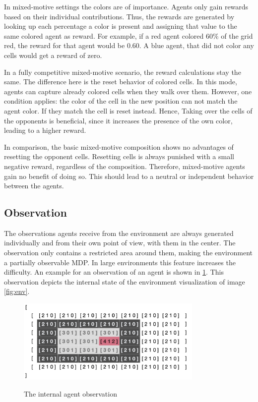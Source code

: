 In mixed-motive settings the colors are of importance. Agents only gain rewards based on their individual contributions. Thus, the rewards are generated by looking up each percentage a color is present and assigning that value to the same colored agent as reward. For example, if a red agent colored 60\% of the grid red, the reward for that agent would be 0.60. A blue agent, that did not color any cells would get a reward of zero.

In a fully competitive mixed-motive scenario, the reward calculations stay the same. The difference here is the reset behavior of colored cells. In this mode, agents can capture already colored cells when they walk over them. However, one condition applies: the color of the cell in the new position can not match the agent color. If they match the cell is reset instead. Hence, Taking over the cells of the opponents is beneficial, since it increases the presence of the own color, leading to a higher reward.

In comparison, the basic mixed-motive composition shows no advantages of resetting the opponent cells. Resetting cells is always punished with a small negative reward, regardless of the composition. Therefore, mixed-motive agents gain no benefit of doing so. This should lead to a neutral or independent behavior between the agents.

\subsection{Observation}
The observations agents receive from the environment are always generated individually and from their own point of view, with them in the center. The observation only contains a restricted area around them, making the environment a partially observable MDP. In large environments this feature increases the difficulty.
An example for an observation of an agent is shown in \ref{fig:agent_obs}. This observation depicts the internal state of the environment visualization of image \ref{fig:env}.

\begin{figure}[hpbt]
    \centering
    \includegraphics[width=0.8\textwidth]{pictures/agent_observation}\\
    \caption[Agent Observation]{The internal agent observation}\label{fig:agent_obs}
\end{figure}

